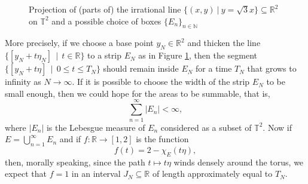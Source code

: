 \documentclass[12pt]{amsart}
\newcommand{\R}{\mathbb{R}}
\newcommand{\N}{\mathbb{N}}
\begin{document}
\begin{figure}

\centering



\caption{Projection of (parts of) the irrational line $ \{ ( x, y ) ~|~ y = \sqrt{3} x \} \subseteq \R^2 $ on $ \mathbb{T}^2 $ and a possible choice of boxes $ \{ E_n \}_{n \in \N } $}
\label{F: E_N}

\end{figure}

More precisely, if we choose a base point $y_{N} \in \R^{2} $ and thicken the line $\{[y_{N} + t \eta_{N}] \, \mid \, t \in \mathbb{R}\}$ to a strip $E_{N}$ as in Figure \ref{F: E_N}, then the segment $\{[y_{N} + t \eta] \, \mid \, 0 \leq t \leq T_{N}\}$ should remain inside $E_{N}$ for a time $T_{N}$ that grows to infinity as $N \to \infty$. If it is possible to choose the width of the strip $E_{N}$ to be small enough, then we could hope for the areas to be summable, that is,
	\begin{equation*}
		\sum_{n = 1}^{\infty} |E_{n}| < \infty,
	\end{equation*}
where $|E_{n}|$ is the Lebesgue measure of $E_{n}$ considered as a subset of $\mathbb{T}^{2}$. Now if $E = \bigcup_{n = 1}^{\infty} E_{n}$ and if $f : \mathbb{R} \to [1,2]$ is the function
	\begin{equation*}
		f(t) = 2 - \chi_{E}(t \eta),
	\end{equation*}
then, morally speaking, since the path $t \mapsto t \eta $ winds densely around the torus, we expect that $f = 1$ in an interval $J_{N} \subseteq \mathbb{R}$ of length approximately equal to $T_{N}$.
\end{document}

